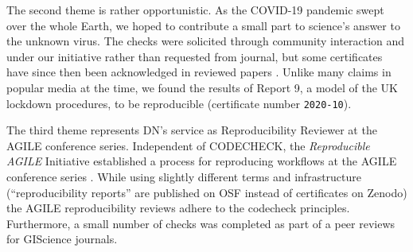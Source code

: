 \documentclass[12pt]{article}
\begin{document}
The second theme is rather opportunistic. As the COVID-19 pandemic swept
over the whole Earth, we hoped to contribute a small part to science's answer
to the unknown virus. The checks were solicited through community interaction
and under our initiative rather than requested from journal, but some certificates
have since then been acknowledged in reviewed papers
\cite{Davies2020-vj,kucharski_effectiveness_2020}. Unlike many claims in
popular media at the time,
we found the results of Report 9, a model of the UK lockdown procedures,
to be reproducible (certificate number \texttt{2020-10}).

The third theme represents DN's service as Reproducibility
Reviewer at the AGILE conference series.
Independent of CODECHECK, the \emph{Reproducible AGILE} Initiative \cite{reproducible_agile}
established a process for reproducing workflows at the AGILE conference
series \cite{nust_improving_2020}.
While using slightly different terms and infrastructure (``reproducibility
reports'' are published on OSF instead of certificates on Zenodo) the 
AGILE reproducibility reviews adhere to the codecheck principles.
Furthermore, a small number of checks was completed as part of a peer reviews
for GIScience journals.
\end{document}
